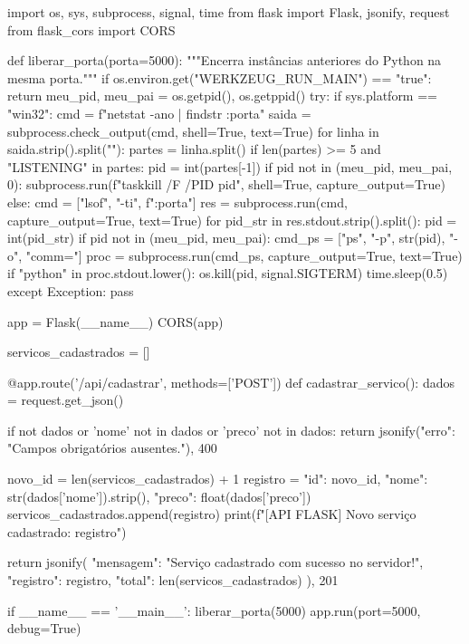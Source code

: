 \begin{boxCodigoPY}
import os, sys, subprocess, signal, time
from flask import Flask, jsonify, request
from flask_cors import CORS

def liberar_porta(porta=5000):
    """Encerra instâncias anteriores do Python na mesma porta."""
    if os.environ.get("WERKZEUG_RUN_MAIN") == "true":
        return
    meu_pid, meu_pai = os.getpid(), os.getppid()
    try:
        if sys.platform == "win32":
            cmd = f"netstat -ano | findstr :{porta}"
            saida = subprocess.check_output(cmd, shell=True, text=True)
            for linha in saida.strip().split("\n"):
                partes = linha.split()
                if len(partes) >= 5 and "LISTENING" in partes:
                    pid = int(partes[-1])
                    if pid not in (meu_pid, meu_pai, 0):
                        subprocess.run(f"taskkill /F /PID {pid}",
                                       shell=True, capture_output=True)
        else:
            cmd = ["lsof", "-ti", f":{porta}"]
            res = subprocess.run(cmd, capture_output=True, text=True)
            for pid_str in res.stdout.strip().split():
                pid = int(pid_str)
                if pid not in (meu_pid, meu_pai):
                    cmd_ps = ["ps", "-p", str(pid), "-o", "comm="]
                    proc = subprocess.run(cmd_ps, capture_output=True,
                                          text=True)
                    if "python" in proc.stdout.lower():
                        os.kill(pid, signal.SIGTERM)
                        time.sleep(0.5)
    except Exception:
        pass

app = Flask(__name__)
CORS(app)

servicos_cadastrados = []

@app.route('/api/cadastrar', methods=['POST'])
def cadastrar_servico():
    dados = request.get_json()
    
    if not dados or 'nome' not in dados or 'preco' not in dados:
        return jsonify({"erro": "Campos obrigatórios ausentes."}), 400

    novo_id = len(servicos_cadastrados) + 1
    registro = {
        "id": novo_id,
        "nome": str(dados['nome']).strip(),
        "preco": float(dados['preco'])
    }
    servicos_cadastrados.append(registro)
    print(f"[API FLASK] Novo serviço cadastrado: {registro}")

    return jsonify({
        "mensagem": "Serviço cadastrado com sucesso no servidor!",
        "registro": registro,
        "total": len(servicos_cadastrados)
    }), 201

if __name__ == '__main__':
    liberar_porta(5000)
    app.run(port=5000, debug=True)
\end{boxCodigoPY}

